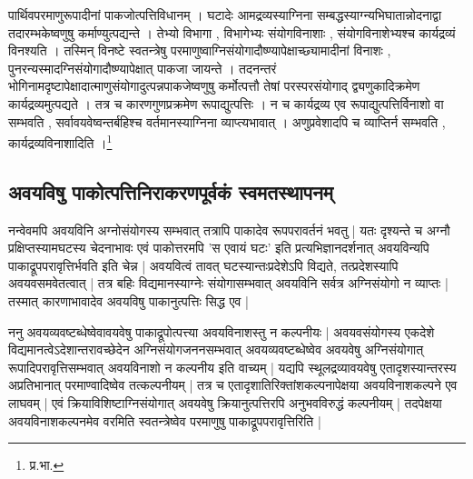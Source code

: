 {\fontsize{11.7}{0}\selectfont\s पार्थिवपरमाणुरूपादीनां पाकजोत्पत्तिविधानम् । घटादेः आमद्रव्यस्याग्निना सम्बद्धस्याग्न्यभिघातान्नोदनाद्वा तदारम्भकेष्वणुषु कर्माण्युत्पद्यन्ते । तेभ्यो विभागा , विभागेभ्यः संयोगविनाशाः , संयोगविनाशेभ्यश्च कार्यद्रव्यं विनश्यति । तस्मिन् विनष्टे स्वतन्त्रेषु परमाणुष्वाग्निसंयोगादौष्ण्यापेक्षाच्छ्यामादीनां विनाशः , पुनरन्यस्मादग्निसंयोगादौष्ण्यापेक्षात् पाकजा जायन्ते । तदनन्तरं भोगिनामदृष्टापेक्षादात्माणुसंयोगादुत्पन्नपाकजेष्वणुषु कर्मोत्पत्तौ तेषां परस्परसंयोगाद् द्व्यणुकादिक्रमेण कार्यद्रव्यमुत्पद्यते । तत्र च कारणगुणप्रक्रमेण रूपाद्युत्पत्तिः ।  न च कार्यद्रव्य एव रूपाद्युत्पत्तिर्विनाशो वा सम्भवति , सर्वावयवेष्वन्तर्बहिश्च वर्तमानस्याग्निना व्याप्त्यभावात् । अणुप्रवेशादपि च व्याप्तिर्न सम्भवति , कार्यद्रव्यविनाशादिति ।\footnote{प्र.भा.}}

\subsection{अवयविषु पाकोत्पत्तिनिराकरणपूर्वकं स्वमतस्थापनम्}

नन्वेवमपि अवयविनि अग्नोसंयोगस्य सम्भवात् तत्रापि पाकादेव रूपपरावर्तनं भवतु | यतः दृश्यन्ते च अग्नौ प्रक्षिप्तस्यामघटस्य चेदनाभावः एवं पाकोत्तरमपि 'स एवायं घटः' इति प्रत्यभिज्ञानदर्शनात् अवयविन्यपि पाकाद्रूपपरावृत्तिर्भवति इति चेन्न | अवयवित्वं तावत् घटस्यान्तःप्रदेशेऽपि विद्यते, तत्प्रदेशस्यापि अवयवसमवेतत्वात् | तत्र बहिः विद्यमानस्याग्नेः संयोगासम्भवात् अवयविनि सर्वत्र अग्निसंयोगो न व्याप्तः | तस्मात् कारणाभावादेव अवयविषु पाकानुत्पत्तिः सिद्ध एव | 

ननु अवयव्यवष्टब्धेष्वेवावयवेषु पाकाद्रूपोत्पत्त्या अवयविनाशस्तु न कल्पनीयः | अवयवसंयोगस्य एकदेशे विद्यमानत्वेऽदेशान्तरावच्छेदेन अग्निसंयोगजननसम्भवात् अवयव्यवष्टब्धेष्वेव अवयवेषु अग्निसंयोगात् रूपादिपरावृत्तिसम्भवात् अवयविनाशो न कल्पनीय इति वाच्यम् | यद्यपि स्थूलद्रव्यावयवेषु एतादृशस्यान्तरस्य अप्रतिभानात् परमाण्वादिष्वेव तत्कल्पनीयम् | तत्र च एतादृशातिरिक्तांशकल्पनापेक्षया अवयविनाशकल्पने एव लाघवम् | एवं क्रियाविशिष्टाग्निसंयोगात् अवयवेषु क्रियानुत्पत्तिरपि अनुभवविरुद्धं कल्पनीयम् | तदपेक्षया अवयविनाशकल्पनमेव वरमिति स्वतन्त्रेष्वेव परमाणुषु पाकाद्रूपपरावृत्तिरिति |

